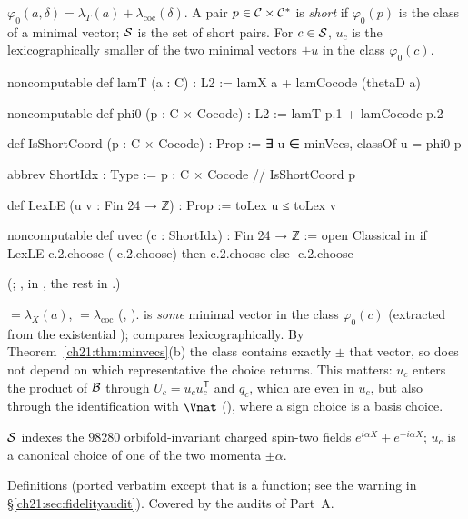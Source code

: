 \begin{definition}\label{ch21:def:short}
$\varphi_0(a,\delta)=\lambda_T(a)+\lambda_{\mathrm{coc}}(\delta)$.  A pair $p\in\mathcal{C}\times\mathcal{C}^*$
is \emph{short} if $\varphi_0(p)$ is the class of a minimal vector; $\mathcal{S}$ is the set of short
pairs.  For $c\in\mathcal{S}$, $u_c$ is the lexicographically smaller of the two minimal vectors $\pm u$
in the class $\varphi_0(c)$.
\end{definition}
\begin{leancode}
noncomputable def lamT (a : C) : L2 := lamX a + lamCocode (thetaD a)
\end{leancode}
\begin{leancode}
noncomputable def phi0 (p : C × Cocode) : L2 := lamT p.1 + lamCocode p.2
\end{leancode}
\begin{leancode}
def IsShortCoord (p : C × Cocode) : Prop := ∃ u ∈ minVecs, classOf u = phi0 p

abbrev ShortIdx : Type := {p : C × Cocode // IsShortCoord p}
\end{leancode}
\begin{leancode}
def LexLE (u v : Fin 24 → ℤ) : Prop := toLex u ≤ toLex v

noncomputable def uvec (c : ShortIdx) : Fin 24 → ℤ :=
  open Classical in
  if LexLE c.2.choose (-c.2.choose) then c.2.choose else -c.2.choose
\end{leancode}
(; ,  in
, the rest in .)
\begin{dictionary}
 $=\lambda_X(a)$,  $=\lambda_{\mathrm{coc}}$ (,
).   is \emph{some} minimal vector in the class $\varphi_0(c)$
(extracted from the existential );  compares lexicographically.  By
Theorem~\ref{ch21:thm:minvecs}(b) the class contains exactly $\pm$ that vector, so  does
not depend on which representative the choice returns.  This matters: $u_c$ enters the product of
$\mathcal{B}$ through $U_c=u_cu_c^{\mathsf T}$ and $q_c$, which are even in $u_c$, but also through the
identification with $\Vnat$ (), where a sign choice is a basis choice.
\end{dictionary}
\begin{physics}
$\mathcal{S}$ indexes the $98280$ orbifold-invariant charged spin-two fields
$e^{i\alpha X}+e^{-i\alpha X}$; $u_c$ is a canonical choice of one of the two momenta $\pm\alpha$.
\end{physics}
\begin{status}
Definitions (ported verbatim except that  is a function; see the warning in
\S\ref{ch21:sec:fidelityaudit}).  Covered by the audits of Part~A.
\end{status}

